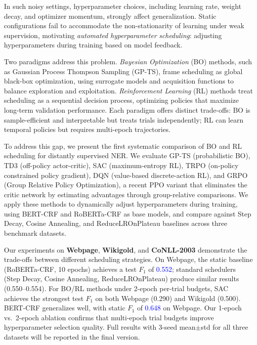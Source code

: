 \documentclass[11pt]{article}
\begin{document}
In such noisy settings, hyperparameter choices, including learning rate, weight decay, and optimizer momentum, strongly affect generalization. Static configurations fail to accommodate the non-stationarity of learning under weak supervision, motivating \textit{automated hyperparameter scheduling}: adjusting hyperparameters during training based on model feedback.

Two paradigms address this problem. \textit{Bayesian Optimization} (BO) methods, such as Gaussian Process Thompson Sampling (GP-TS), frame scheduling as global black-box optimization, using surrogate models and acquisition functions to balance exploration and exploitation. \textit{Reinforcement Learning} (RL) methods treat scheduling as a sequential decision process, optimizing policies that maximize long-term validation performance. Each paradigm offers distinct trade-offs: BO is sample-efficient and interpretable but treats trials independently; RL can learn temporal policies but requires multi-epoch trajectories.

To address this gap, we present the first systematic comparison of BO and RL scheduling for distantly supervised NER. We evaluate GP-TS (probabilistic BO), TD3 (off-policy actor-critic), SAC (maximum-entropy RL), TRPO (on-policy constrained policy gradient), DQN (value-based discrete-action RL), and GRPO (Group Relative Policy Optimization), a recent PPO variant that eliminates the critic network by estimating advantages through group-relative comparisons. We apply these methods to dynamically adjust hyperparameters during training, using BERT-CRF and RoBERTa-CRF as base models, and compare against Step Decay, Cosine Annealing, and ReduceLROnPlateau baselines across three benchmark datasets.

Our experiments on \textbf{Webpage}, \textbf{Wikigold}, and \textbf{CoNLL-2003} demonstrate the trade-offs between different scheduling strategies. On Webpage, the static baseline (RoBERTa-CRF, 10 epochs) achieves a test $F_1$ of \textcolor{blue}{0.552}; standard schedulers (Step Decay, Cosine Annealing, ReduceLROnPlateau) produce similar results (0.550--0.554). For BO/RL methods under 2-epoch per-trial budgets, SAC achieves the strongest test $F_1$ on both Webpage (0.290) and Wikigold (0.500). BERT-CRF generalizes well, with static $F_1$ of \textcolor{blue}{0.648} on Webpage. Our 1-epoch vs.\ 2-epoch ablation confirms that multi-epoch trial budgets improve hyperparameter selection quality. Full results with 3-seed mean$\pm$std for all three datasets will be reported in the final version.
\end{document}
